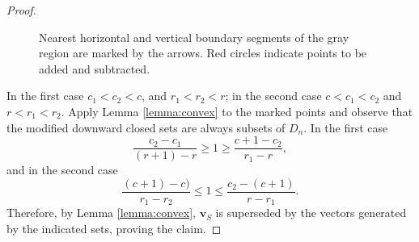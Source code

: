 \documentclass[10pt,a4paper]{amsart}
\renewcommand\ge{\geqslant}\renewcommand\le{\leqslant}
\begin{document}
\begin{proof}
\begin{figure}[h!tb]
\caption{Nearest horizontal and vertical boundary segments of the gray
region are marked by the arrows. Red circles indicate points to be added and
subtracted.
}\label{fig:corr1}
\end{figure}
In the first case $c_1<c_2<c$, and $r_1<r_2<r$; in the second case
$c<c_1<c_2$ and $r<r_1<r_2$. Apply Lemma \ref{lemma:convex} to the marked
points and observe that the modified downward closed sets are always subsets
of $D_n$. In the first case
$$
   \frac{c_2-c_1}{(r+1)-r} \ge 1 \ge \frac{c+1-c_2}{r_1-r},
$$
and in the second case
$$
   \frac{(c+1)-c)}{r_1-r_2} \le 1 \le \frac{c_2-(c+1)}{r-r_1}.
$$
Therefore, by Lemma \ref{lemma:convex}, $\mathbf v_S$ is superseded by the
vectors generated by the indicated sets, proving the claim.
\end{proof}
\end{document}
